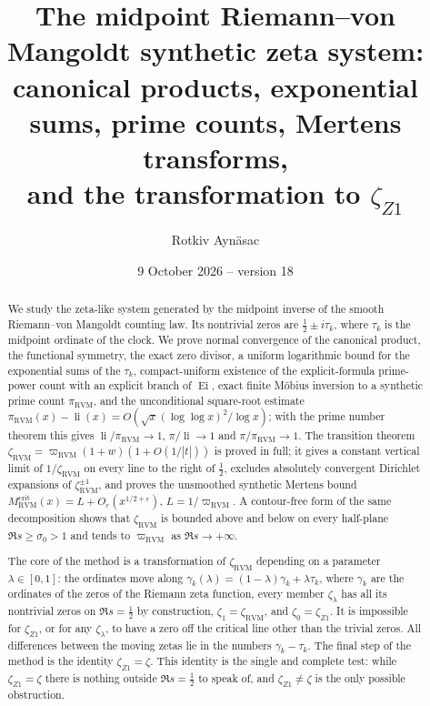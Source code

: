 \documentclass[11pt,reqno]{amsart}
\numberwithin{equation}{section}
\theoremstyle{plain}
\theoremstyle{definition}
\theoremstyle{remark}
\newcommand{\eps}{\varepsilon}
\newcommand{\li}{\operatorname{li}}
\newcommand{\Ei}{\operatorname{Ei}}
\newcommand{\RVM}{\mathrm{RVM}}
\newcommand{\crit}{\mathrm{crit}}
\begin{document}
\title[The midpoint RVM synthetic zeta system]{The midpoint Riemann--von Mangoldt synthetic zeta system:\\
canonical products, exponential sums, prime counts, Mertens transforms,\\
and the transformation to $\zeta_{Z1}$}
\author{Rotkiv Ayn\"asac\\[2pt]\mbox{}}
\date{9 October 2026 -- version 18}

\begin{abstract}
We study the zeta-like system generated by the midpoint inverse of the smooth Riemann--von Mangoldt counting law.  Its nontrivial zeros are $\tfrac12\pm i\tau_k$, where $\tau_k$ is the midpoint ordinate of the clock.  We prove normal convergence of the canonical product, the functional symmetry, the exact zero divisor, a uniform logarithmic bound for the exponential sums of the $\tau_k$, compact-uniform existence of the explicit-formula prime-power count with an explicit branch of $\Ei$, exact finite M\"obius inversion to a synthetic prime count $\pi_{\RVM}$, and the unconditional square-root estimate $\pi_{\RVM}(x)-\li(x)=O(\sqrt x(\log\log x)^2/\log x)$; with the prime number theorem this gives $\li/\pi_{\RVM}\to1$, $\pi/\li\to1$ and $\pi/\pi_{\RVM}\to1$.  The transition theorem $\zeta_{\RVM}=\varpi_{\RVM}(1+w)(1+O(1/|t|))$ is proved in full; it gives a constant vertical limit of $1/\zeta_{\RVM}$ on every line to the right of $\tfrac12$, excludes absolutely convergent Dirichlet expansions of $\zeta_{\RVM}^{\pm1}$, and proves the unsmoothed synthetic Mertens bound $M_{\RVM}^{\crit}(x)=L+O_\eps(x^{1/2+\eps})$, $L=1/\varpi_{\RVM}$.  A contour-free form of the same decomposition shows that $\zeta_{\RVM}$ is bounded above and below on every half-plane $\Re s\ge\sigma_0>1$ and tends to $\varpi_{\RVM}$ as $\Re s\to+\infty$.

The core of the method is a transformation of $\zeta_{\RVM}$ depending on a parameter $\lambda\in[0,1]$: the ordinates move along $\gamma_k(\lambda)=(1-\lambda)\gamma_k+\lambda\tau_k$, where $\gamma_k$ are the ordinates of the zeros of the Riemann zeta function, every member $\zeta_\lambda$ has all its nontrivial zeros on $\Re s=\tfrac12$ by construction, $\zeta_1=\zeta_{\RVM}$, and $\zeta_0=\zeta_{Z1}$.  It is impossible for $\zeta_{Z1}$, or for any $\zeta_\lambda$, to have a zero off the critical line other than the trivial zeros.  All differences between the moving zetas lie in the numbers $\gamma_k-\tau_k$.  The final step of the method is the identity $\zeta_{Z1}=\zeta$.  This identity is the single and complete test: while $\zeta_{Z1}=\zeta$ there is nothing outside $\Re s=\tfrac12$ to speak of, and $\zeta_{Z1}\neq\zeta$ is the only possible obstruction.


\end{abstract}
\end{document}
